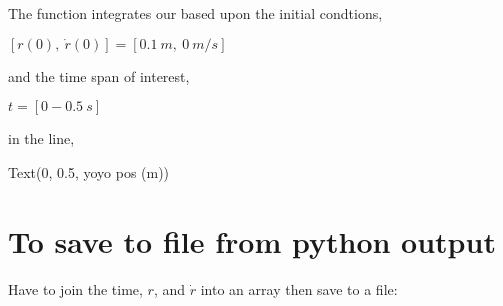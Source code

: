 \documentclass[letterpaper,10pt,english]{sphinxmanual}
\begin{document}
The function  integrates our  based upon the initial condtions,

\([r(0),~\dot{r}(0)] = [0.1~m,~0~m/s]\)

and the time span of interest,

\(t = [0-0.5~s]\)

in the line, 

\begin{sphinxVerbatim}[commandchars=\\\{\}]
\PYG{p}{[}\PYG{p}{]}

\PYG{p}{[}\PYG{p}{]}
\end{sphinxVerbatim}

\begin{sphinxVerbatim}[commandchars=\\\{\}]
Text(0, 0.5, \PYGZsq{}yoyo pos (m)\PYGZsq{})
\end{sphinxVerbatim}

\noindent{}


\section{To save to file from python output}
\label{\detokenize{module_04/yoyo-despin:to-save-to-file-from-python-output}}
Have to join the time, \(r\), and \(\dot{r}\) into an array then save to a file:

\begin{sphinxVerbatim}[commandchars=\\\{\}]
\PYG{p}{[}\PYG{p}{[}\PYG{p}{]}\PYG{p}{[}\PYG{p}{]}\PYG{p}{]}
\end{sphinxVerbatim}
\end{document}
